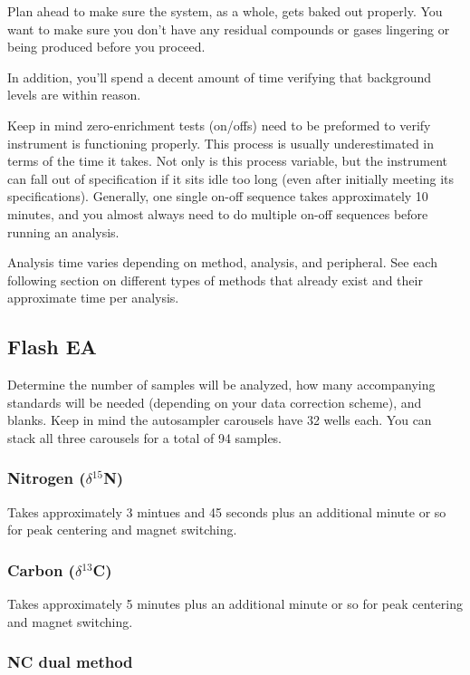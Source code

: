 \documentclass[12pt]{../SOP4_alpha}\usepackage[]{graphicx}\usepackage[]{color}
\begin{document}
\NP Plan ahead to make sure the system, as a whole, gets baked out properly. You want to make sure you don't have any residual compounds or gases lingering or being produced before you proceed.

\NP In addition, you'll spend a decent amount of time verifying that background levels are within reason. 

\NP Keep in mind zero-enrichment tests (on/offs) need to be preformed to verify instrument is functioning properly. This process is usually underestimated in terms of the time it takes. Not only is this process variable, but the instrument can fall out of specification if it sits idle too long (even after initially meeting its specifications). Generally, one single on-off sequence takes approximately 10 minutes, and you almost always need to do multiple on-off sequences before running an analysis.

\NP Analysis time varies depending on method, analysis, and peripheral. See each following section on different types of methods that already exist and their approximate time per analysis.

\subsection{Flash EA}

\NP Determine the number of samples will be analyzed, how many accompanying standards will be needed (depending on your data correction scheme), and blanks. Keep in mind the autosampler carousels have 32 wells each. You can stack all three carousels for a total of 94 samples.

\subsubsection{Nitrogen ($\delta$$^{15}$N)}

\NP Takes approximately 3 mintues and 45 seconds plus an additional minute or so for peak centering and magnet switching.

\subsubsection{Carbon ($\delta$$^{13}$C)}

\NP Takes approximately 5 minutes plus an additional minute or so for peak centering and magnet switching.

\subsubsection{NC dual method}
\end{document}
